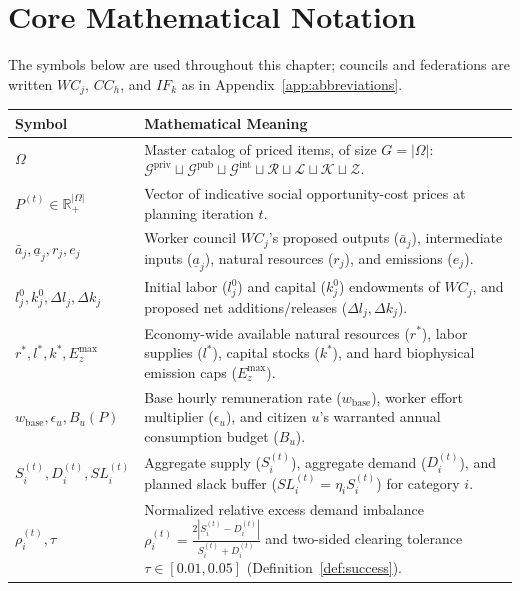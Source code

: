 \documentclass[10pt,twoside,openany]{book}
\renewcommand{\arraystretch}{1.22}
\theoremstyle{dpepstyle}
\begin{document}
\section*{Core Mathematical Notation}

The symbols below are used throughout this chapter; councils and federations are written $WC_j$, $CC_h$, and $IF_k$ as in Appendix~\ref{app:abbreviations}.

{\scriptsize\setlength{\tabcolsep}{4pt}\renewcommand{\arraystretch}{1.18}
\begin{longtable}{L{0.92in} L{3.74in}}
\toprule
\textbf{Symbol} & \textbf{Mathematical Meaning} \\
\midrule
$\Omega$ & Master catalog of priced items, of size $G = |\Omega|$: $\mathcal{G}^{\text{priv}} \sqcup \mathcal{G}^{\text{pub}} \sqcup \mathcal{G}^{\text{int}} \sqcup \mathcal{R} \sqcup \mathcal{L} \sqcup \mathcal{K} \sqcup \mathcal{Z}$. \\
$P^{(t)} \in \mathbb{R}_+^{|\Omega|}$ & Vector of indicative social opportunity-cost prices at planning iteration $t$. \\
$\bar{a}_j, \underline{a}_j, r_j, e_j$ & Worker council $WC_j$'s proposed outputs ($\bar{a}_j$), intermediate inputs ($\underline{a}_j$), natural resources ($r_j$), and emissions ($e_j$). \\
$l_j^0, k_j^0, \Delta l_j, \Delta k_j$ & Initial labor ($l_j^0$) and capital ($k_j^0$) endowments of $WC_j$, and proposed net additions/releases ($\Delta l_j, \Delta k_j$). \\
$r^*, l^*, k^*, E_z^{\max}$ & Economy-wide available natural resources ($r^*$), labor supplies ($l^*$), capital stocks ($k^*$), and hard biophysical emission caps ($E_z^{\max}$). \\
$w_{\text{base}}, \epsilon_u, B_u(P)$ & Base hourly remuneration rate ($w_{\text{base}}$), worker effort multiplier ($\epsilon_u$), and citizen $u$'s warranted annual consumption budget ($B_u$). \\
$S_i^{(t)}, D_i^{(t)}, SL_i^{(t)}$ & Aggregate supply ($S_i^{(t)}$), aggregate demand ($D_i^{(t)}$), and planned slack buffer ($SL_i^{(t)} = \eta_i S_i^{(t)}$) for category $i$. \\
$\rho_i^{(t)}, \tau$ & Normalized relative excess demand imbalance $\rho_i^{(t)} = \frac{2|S_i^{(t)} - D_i^{(t)}|}{S_i^{(t)} + D_i^{(t)}}$ and two-sided clearing tolerance $\tau \in [0.01, 0.05]$ (Definition~\ref{def:success}). \\
\bottomrule
\end{longtable}}
\end{document}
